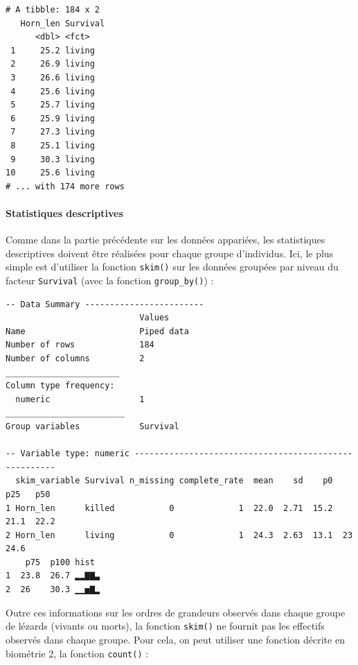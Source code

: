 \documentclass[
  a4paper,
]{article}
\newenvironment{Shaded}{\begin{snugshade}}{\end{snugshade}}
\newcommand{\KeywordTok}[1]{\textcolor[rgb]{0.12,0.11,0.11}{\textbf{#1}}}
\newcommand{\NormalTok}[1]{\textcolor[rgb]{0.12,0.11,0.11}{#1}}
\newcommand{\OperatorTok}[1]{\textcolor[rgb]{0.12,0.11,0.11}{#1}}
\newcommand{\StringTok}[1]{\textcolor[rgb]{0.75,0.01,0.01}{#1}}
\begin{document}
\begin{verbatim}
# A tibble: 184 x 2
   Horn_len Survival
      <dbl> <fct>   
 1     25.2 living  
 2     26.9 living  
 3     26.6 living  
 4     25.6 living  
 5     25.7 living  
 6     25.9 living  
 7     27.3 living  
 8     25.1 living  
 9     30.3 living  
10     25.6 living  
# ... with 174 more rows
\end{verbatim}

\hypertarget{statistiques-descriptives-2}{%
\paragraph{Statistiques descriptives}\label{statistiques-descriptives-2}}

Comme dans la partie précédente sur les données appariées, les statistiques descriptives doivent être réalisées pour chaque groupe d'individus. Ici, le plus simple est d'utiliser la fonction \texttt{skim()} sur les données groupées par niveau du facteur \texttt{Survival} (avec la fonction \texttt{group\_by()}) :

\begin{Shaded}
\end{Shaded}

\begin{verbatim}
-- Data Summary ------------------------
                           Values    
Name                       Piped data
Number of rows             184       
Number of columns          2         
_______________________              
Column type frequency:               
  numeric                  1         
________________________             
Group variables            Survival  

-- Variable type: numeric ------------------------------------------------------
  skim_variable Survival n_missing complete_rate  mean    sd    p0   p25   p50
1 Horn_len      killed           0             1  22.0  2.71  15.2  21.1  22.2
2 Horn_len      living           0             1  24.3  2.63  13.1  23    24.6
    p75  p100 hist 
1  23.8  26.7 ▂▂▇▇▃
2  26    30.3 ▁▁▅▇▂
\end{verbatim}

Outre ces informations sur les ordres de grandeurs observés dans chaque groupe de lézards (vivants ou morts), la fonction \texttt{skim()} ne fournit pas les effectifs observés dans chaque groupe. Pour cela, on peut utiliser une fonction décrite en biométrie 2, la fonction \texttt{count()} :
\end{document}
